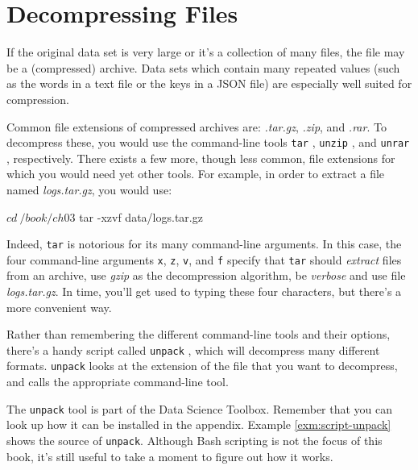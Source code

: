 \documentclass[
]{book}
\newenvironment{Shaded}{\begin{snugshade}}{\end{snugshade}}
\newcommand{\BuiltInTok}[1]{#1}
\newcommand{\FunctionTok}[1]{\textcolor[rgb]{0.00,0.00,0.00}{#1}}
\newcommand{\NormalTok}[1]{#1}
\theoremstyle{definition}
\theoremstyle{definition}
\theoremstyle{definition}
\theoremstyle{remark}
\begin{document}
\hypertarget{decompressing-files}{%
\section{Decompressing Files}\label{decompressing-files}}

If the original data set is very large or it's a collection of many files, the file may be a (compressed) archive. Data sets which contain many repeated values (such as the words in a text file or the keys in a JSON file) are especially well suited for compression.

Common file extensions of compressed archives are: \emph{.tar.gz}, \emph{.zip}, and \emph{.rar}. To decompress these, you would use the command-line tools \texttt{tar} \citep{tar}, \texttt{unzip} \citep{unzip}, and \texttt{unrar} \citep{unrar}, respectively. There exists a few more, though less common, file extensions for which you would need yet other tools. For example, in order to extract a file named \emph{logs.tar.gz}, you would use:

\begin{Shaded}
\begin{Highlighting}[]
\NormalTok{$ }\BuiltInTok{cd}\NormalTok{ ~/book/ch03}
\NormalTok{$ }\FunctionTok{tar}\NormalTok{ -xzvf data/logs.tar.gz}
\end{Highlighting}
\end{Shaded}

Indeed, \texttt{tar} is notorious for its many command-line arguments. In this case, the four command-line arguments \texttt{x}, \texttt{z}, \texttt{v}, and \texttt{f} specify that \texttt{tar} should \emph{extract} files from an archive, use \emph{gzip} as the decompression algorithm, be \emph{verbose} and use file \emph{logs.tar.gz}. In time, you'll get used to typing these four characters, but there's a more convenient way.

Rather than remembering the different command-line tools and their options, there's a handy script called \texttt{unpack} \citep{unpack}, which will decompress many different formats. \texttt{unpack} looks at the extension of the file that you want to decompress, and calls the appropriate command-line tool.

The \texttt{unpack} tool is part of the Data Science Toolbox. Remember that you can look up how it can be installed in the appendix. Example \ref{exm:script-unpack} shows the source of \texttt{unpack}. Although Bash scripting is not the focus of this book, it's still useful to take a moment to figure out how it works.
\end{document}
